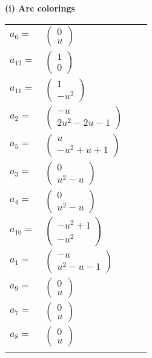\documentclass[1p]{elsarticle_modified}
\theoremstyle{definition}
\begin{document}
\flushleft \textbf{(i) Arc colorings}\\
\begin{tabular}{m{7pt} m{180pt} m{7pt} m{180pt} }
\flushright $a_{6}=$&$\begin{pmatrix}0\\u\end{pmatrix}$ \\
\flushright $a_{12}=$&$\begin{pmatrix}1\\0\end{pmatrix}$ \\
\flushright $a_{11}=$&$\begin{pmatrix}1\\- u^2\end{pmatrix}$ \\
\flushright $a_{2}=$&$\begin{pmatrix}- u\\2 u^2-2 u-1\end{pmatrix}$ \\
\flushright $a_{5}=$&$\begin{pmatrix}u\\- u^2+u+1\end{pmatrix}$ \\
\flushright $a_{3}=$&$\begin{pmatrix}0\\u^2- u\end{pmatrix}$ \\
\flushright $a_{4}=$&$\begin{pmatrix}0\\u^2- u\end{pmatrix}$ \\
\flushright $a_{10}=$&$\begin{pmatrix}- u^2+1\\- u^2\end{pmatrix}$ \\
\flushright $a_{1}=$&$\begin{pmatrix}- u\\u^2- u-1\end{pmatrix}$ \\
\flushright $a_{9}=$&$\begin{pmatrix}0\\u\end{pmatrix}$ \\
\flushright $a_{7}=$&$\begin{pmatrix}0\\u\end{pmatrix}$ \\
\flushright $a_{8}=$&$\begin{pmatrix}0\\u\end{pmatrix}$\\&\end{tabular}
\end{document}
